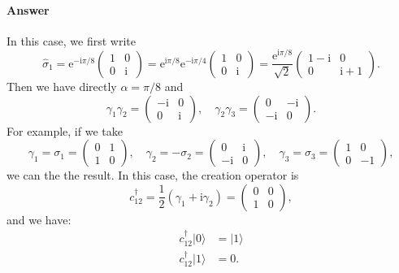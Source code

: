 \documentclass{book}
\begin{document}
\paragraph{Answer}
In this case, we first write
\begin{equation*}
\hat{\sigma }_{1} =\mathrm{e}^{-\mathrm{i} \pi /8}\begin{pmatrix}
1 & 0\\
0 & \mathrm{i}
\end{pmatrix} =\mathrm{e}^{\mathrm{i} \pi /8}\mathrm{e}^{-\mathrm{i} \pi /4}\begin{pmatrix}
1 & 0\\
0 & \mathrm{i}
\end{pmatrix} =\frac{\mathrm{e}^{\mathrm{i} \pi /8}}{\sqrt{2}}\begin{pmatrix}
1-\mathrm{i} & 0\\
0 & \mathrm{i} +1
\end{pmatrix} .
\end{equation*}
Then we have directly $\alpha =\pi /8$ and
\begin{equation*}
\gamma _{1} \gamma _{2} =\begin{pmatrix}
-\mathrm{i} & 0\\
0 & \mathrm{i}
\end{pmatrix} ,\quad \gamma _{2} \gamma _{3} =\begin{pmatrix}
0 & -\mathrm{i}\\
-\mathrm{i} & 0
\end{pmatrix} .
\end{equation*}
For example, if we take
\begin{equation*}
\gamma _{1} =\sigma _{1} =\begin{pmatrix}
0 & 1\\
1 & 0
\end{pmatrix} ,\quad \gamma _{2} =-\sigma _{2} =\begin{pmatrix}
0 & \mathrm{i}\\
-\mathrm{i} & 0
\end{pmatrix} ,\quad \gamma _{3} =\sigma _{3} =\begin{pmatrix}
1 & 0\\
0 & -1
\end{pmatrix} ,
\end{equation*}
we can the the result. In this case, the creation operator is
\begin{equation*}
c_{12}^{\dagger } =\frac{1}{2}( \gamma _{1} +\mathrm{i} \gamma _{2}) =\begin{pmatrix}
0 & 0\\
1 & 0
\end{pmatrix} ,
\end{equation*}
and we have:
\begin{equation*}
\begin{aligned}
c_{12}^{\dagger } |0 \rangle  & =|1 \rangle \\
c_{12}^{\dagger } |1 \rangle  & =0.
\end{aligned}
\end{equation*}
\end{document}
